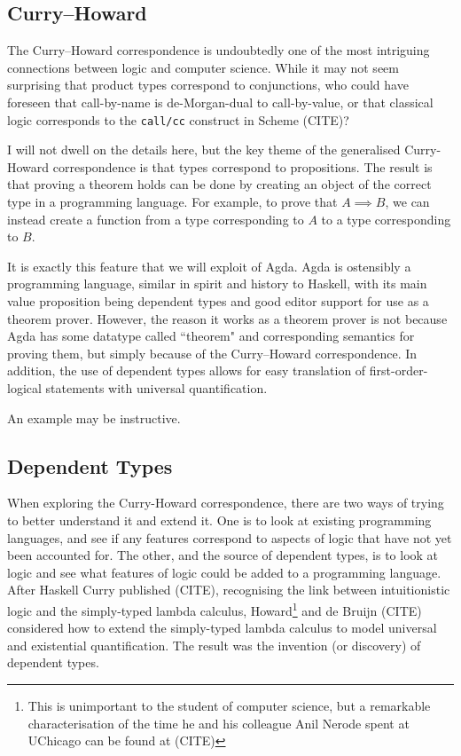 \documentclass[12pt,a4paper,twoside,openright]{report}
\begin{document}
\subsection{Curry--Howard}
The Curry--Howard correspondence is undoubtedly one of the most intriguing connections between logic and computer science. While it may not seem surprising that product types correspond to conjunctions, who could have foreseen that call-by-name is de-Morgan-dual to call-by-value, or that classical logic corresponds to the \texttt{call/cc} construct in Scheme (CITE)?

I will not dwell on the details here, but the key theme of the generalised Curry-Howard correspondence is that types correspond to propositions. The result is that proving a theorem holds can be done by creating an object of the correct type in a programming language. For example, to prove that $A \implies B$, we can instead create a function from a type corresponding to $A$ to a type corresponding to $B$. 

It is exactly this feature that we will exploit of Agda. Agda is ostensibly a programming language, similar in spirit and history to Haskell, with its main value proposition being dependent types and good editor support for use as a theorem prover. However, the reason it works as a theorem prover is not because Agda has some datatype called ``theorem" and corresponding semantics for proving them, but simply because of the Curry--Howard correspondence. In addition, the use of dependent types allows for easy translation of first-order-logical statements with universal quantification. 

An example may be instructive. 
\subsection{Dependent Types}
When exploring the Curry-Howard correspondence, there are two ways of trying to better understand it and extend it. One is to look at existing programming languages, and see if any features correspond to aspects of logic that have not yet been accounted for. The other, and the source of dependent types, is to look at logic and see what features of logic could be added to a programming language. After Haskell Curry published (CITE), recognising the link between intuitionistic logic and the simply-typed lambda calculus, Howard\footnote{This is unimportant to the student of computer science, but a remarkable characterisation of the time he and his colleague Anil Nerode spent at UChicago can be found at (CITE)} and de Bruijn (CITE) considered how to extend the simply-typed lambda calculus to model universal and existential quantification. The result was the invention (or discovery) of dependent types.
\end{document}
